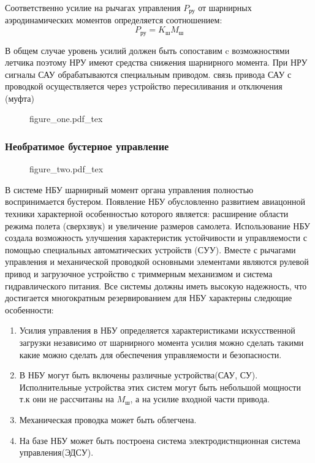 \documentclass{article}
\begin{document}
Соответственно усилие на рычагах управления $P_\text{ру}$ от шарнирных аэродинамических моментов определяется соотношением:
\[
	P_\text{ру} = K_\text{ш} M_\text{ш}
\]

В общем случае уровень усилий должен быть сопоставим c возможностями летчика поэтому НРУ имеют средства снижения шарнирного момента. При НРУ сигналы САУ обрабатываются специальным приводом. связь привода САУ с проводкой осуществляется через устройство пересиливания и отключения (муфта)


\begin{figure}[ht]
	{figure_one.pdf_tex}
\end{figure}

\subsubsection{Необратимое бустерное управление}

\begin{figure}[ht]
	{figure_two.pdf_tex}
\end{figure}

В системе НБУ шарнирный момент органа управления полностью воспринимается бустером. Появление НБУ обусловленно развитием авиацонной техники характерной особенностью которого является: расширение области режима полета (сверхзвук) и увеличение размеров самолета. Использование НБУ создала возможность улучшения характеристик устойчивости и управляемости с помощью специальных автоматических устройств (СУУ). Вместе с рычагами управления и механической проводкой основными элементами являются рулевой привод и загрузочное устройство с триммерным механизмом и система гидравлического питания. Все системы должны иметь высокую надежность, что достигается многократным резервированием для НБУ характерны следющие особенности:
\begin{enumerate}
	\item Усилия управления в НБУ определяется характеристиками искусственной загрузки независимо от шарнирного момента усилия можно сделать такими какие можно сделать для обеспечения управляемости и безопасности.
    \item В НБУ могут быть включены различные устройства(САУ, СУ). Исполнительные устройства этих систем могут быть небольшой мощности т.к они не рассчитаны на $M_\text{ш}$, а на усилие входной части привода.
	\item Механическая проводка может быть облегчена.
	\item На базе НБУ может быть построена система электродистнционная система управления(ЭДСУ).
\end{enumerate}
\end{document}
